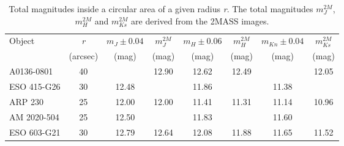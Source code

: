 \documentclass{aa}
\begin{document}
\begin{table}[h]
\centering
\caption[]{Total magnitudes inside a circular area of a given radius {\it r}.
The total magnitudes $m_J^{2M}$, $m_H^{2M}$ and $m_{Ks}^{2M}$ are derived 
from the 2MASS images.}
\label{totm}
\begin{tabular}{lccccccc}
\hline\hline
Object& {\it r}&$m_J \pm 0.04$ &$m_J^{2M}$& $m_H \pm 0.06$& 
$m_H^{2M}$& $m_{Kn} \pm 0.04$& $m_{Ks}^{2M}$ \\
      & (arcsec)& (mag)& (mag)& (mag)& (mag)& (mag)& (mag)\\
\hline
A0136-0801 & 40&      & 12.90& 12.62& 12.49&      & 12.05\\
ESO 415-G26& 30& 12.48&      & 11.86&      & 11.38&      \\
ARP 230    & 25& 12.00& 12.00& 11.41& 11.31& 11.14& 10.96\\
AM 2020-504& 25& 12.50&      & 11.83&      & 11.60&      \\
ESO 603-G21& 30& 12.79& 12.64& 12.08& 11.88& 11.65& 11.52\\
\hline
\end{tabular}
\end{table}
\end{document}
